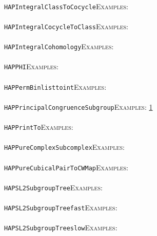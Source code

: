 \documentclass[a4paper,11pt]{report}
\begin{document}
{{ \\
 \texttt{HAP{\textunderscore}IntegralClassToCocycle}{\nobreakspace}{\nobreakspace}{\nobreakspace}{\nobreakspace}\textsc{Examples:} \\
 \\
 \texttt{HAP{\textunderscore}IntegralCocycleToClass}{\nobreakspace}{\nobreakspace}{\nobreakspace}{\nobreakspace}\textsc{Examples:} \\
 \\
 \texttt{HAP{\textunderscore}IntegralCohomology}{\nobreakspace}{\nobreakspace}{\nobreakspace}{\nobreakspace}\textsc{Examples:} \\
 \\
 \texttt{HAP{\textunderscore}PHI}{\nobreakspace}{\nobreakspace}{\nobreakspace}{\nobreakspace}\textsc{Examples:} \\
 \\
 \texttt{HAP{\textunderscore}PermBinlisttoint}{\nobreakspace}{\nobreakspace}{\nobreakspace}{\nobreakspace}\textsc{Examples:} \\
 \\
 \texttt{HAP{\textunderscore}PrincipalCongruenceSubgroup}{\nobreakspace}{\nobreakspace}{\nobreakspace}{\nobreakspace}\textsc{Examples:} \href{tutorial/chap10.html} {1}{\nobreakspace} \\
 \\
 \texttt{HAP{\textunderscore}PrintTo}{\nobreakspace}{\nobreakspace}{\nobreakspace}{\nobreakspace}\textsc{Examples:} \\
 \\
 \texttt{HAP{\textunderscore}PureComplexSubcomplex}{\nobreakspace}{\nobreakspace}{\nobreakspace}{\nobreakspace}\textsc{Examples:} \\
 \\
 \texttt{HAP{\textunderscore}PureCubicalPairToCWMap}{\nobreakspace}{\nobreakspace}{\nobreakspace}{\nobreakspace}\textsc{Examples:} \\
 \\
 \texttt{HAP{\textunderscore}SL2SubgroupTree}{\nobreakspace}{\nobreakspace}{\nobreakspace}{\nobreakspace}\textsc{Examples:} \\
 \\
 \texttt{HAP{\textunderscore}SL2SubgroupTree{\textunderscore}fast}{\nobreakspace}{\nobreakspace}{\nobreakspace}{\nobreakspace}\textsc{Examples:} \\
 \\
 \texttt{HAP{\textunderscore}SL2SubgroupTree{\textunderscore}slow}{\nobreakspace}{\nobreakspace}{\nobreakspace}{\nobreakspace}\textsc{Examples:} \\
}}
\end{document}
